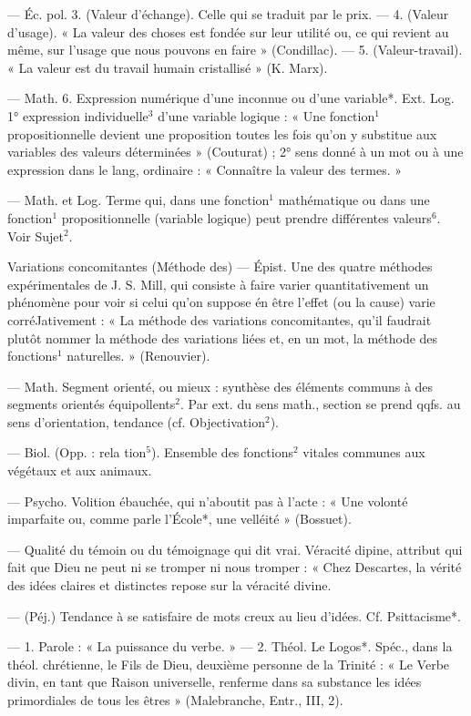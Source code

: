 \begin{itemize}[leftmargin=1cm, label=, itemsep=1pt]
— Éc. pol. 3. (Valeur d'échange).
Celle qui se traduit par le prix. —
4. (Valeur d'usage). « La valeur des
choses est fondée sur leur utilité ou,
ce qui revient au même, sur l'usage
que nous pouvons en faire » (Condillac). — 5. (Valeur-travail). « La
valeur est du travail humain cristallisé » (K. Marx).

— Math. 6. Expression numérique d’une inconnue ou d’une variable*. Ext. Log. 1° expression
individuelle$^3$ d’une variable logique : « Une fonction$^1$ propositionnelle devient une proposition toutes
les fois qu'on y substitue aux variables des valeurs déterminées »
(Couturat) ; 2° sens donné à un mot
ou à une expression dans le lang,
ordinaire : « Connaître la valeur des
termes. »

 — Math. et Log. Terme qui,
dans une fonction$^1$ mathématique
ou dans une fonction$^1$ propositionnelle (variable logique) peut prendre
différentes valeurs$^6$. Voir Sujet$^2$.

Variations concomitantes (Méthode des)\ib{} — Épist. Une des quatre
méthodes expérimentales de
J. S. Mill, qui consiste à faire varier
quantitativement un phénomène
pour voir si celui qu’on suppose én
être l’effet (ou la cause) varie corréJativement : « La méthode des variations concomitantes, qu’il faudrait
plutôt nommer la méthode des variations liées et, en un mot, la méthode des fonctions$^1$ naturelles. »
(Renouvier).

 — Math. Segment orienté,
ou mieux : synthèse des éléments
communs à des segments orientés
équipollents$^2$. Par ext. du sens math.,
section se prend qqfs. au sens d’orientation, tendance (cf. Objectivation$^2$).

 — Biol. (Opp. : rela
tion$^5$). Ensemble des fonctions$^2$ vitales communes aux végétaux et
aux animaux.

 — Psycho. Volition ébauchée,
qui n'aboutit pas à l'acte : « Une
volonté imparfaite ou, comme parle
l'École*, une velléité » (Bossuet).

 — Qualité du témoin ou du
témoignage qui dit vrai. Véracité
dipine, attribut qui fait que Dieu
ne peut ni se tromper ni nous tromper : « Chez Descartes, la vérité des
idées claires et distinctes repose sur
la véracité divine.

 — (Péj.) Tendance à se
satisfaire de mots creux au lieu
d'idées. Cf. Psittacisme*.

 — 1. Parole : « La puissance
du verbe. » — 2. Théol. Le Logos*.
Spéc., dans la théol. chrétienne, le
Fils de Dieu, deuxième personne de
la Trinité : « Le Verbe divin, en tant
que Raison universelle, renferme
dans sa substance les idées primordiales de tous les êtres » (Malebranche, Entr., III, 2).


\end{itemize}
